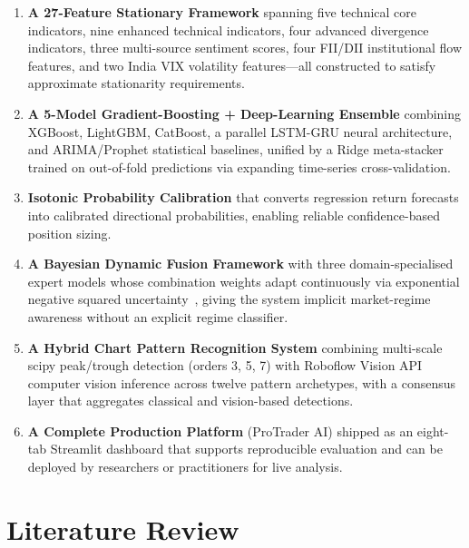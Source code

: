 \documentclass[10pt,a4paper,twoside]{article}
\begin{document}
\begin{enumerate}
\item \textbf{A 27-Feature Stationary Framework} spanning five technical core
  indicators, nine enhanced technical indicators, four advanced divergence
  indicators, three multi-source sentiment scores, four FII/DII institutional
  flow features, and two India VIX volatility features---all constructed to
  satisfy approximate stationarity requirements.

\item \textbf{A 5-Model Gradient-Boosting + Deep-Learning Ensemble} combining
  XGBoost, LightGBM, CatBoost, a parallel LSTM-GRU neural architecture, and
  ARIMA/Prophet statistical baselines, unified by a Ridge meta-stacker trained
  on out-of-fold predictions via expanding time-series cross-validation.

\item \textbf{Isotonic Probability Calibration} that converts regression
  return forecasts into calibrated directional probabilities, enabling reliable
  confidence-based position sizing.

\item \textbf{A Bayesian Dynamic Fusion Framework} with three domain-specialised
  expert models whose combination weights adapt continuously via
  exponential negative squared uncertainty~\cite{gal2016}, giving the system
  implicit market-regime awareness without an explicit regime classifier.

\item \textbf{A Hybrid Chart Pattern Recognition System} combining multi-scale
  scipy peak/trough detection (orders 3, 5, 7) with Roboflow Vision API
  computer vision inference across twelve pattern archetypes, with a consensus
  layer that aggregates classical and vision-based detections.

\item \textbf{A Complete Production Platform} (ProTrader AI) shipped as an
  eight-tab Streamlit dashboard that supports reproducible evaluation and
  can be deployed by researchers or practitioners for live analysis.
\end{enumerate}

\section{Literature Review}
\end{document}
